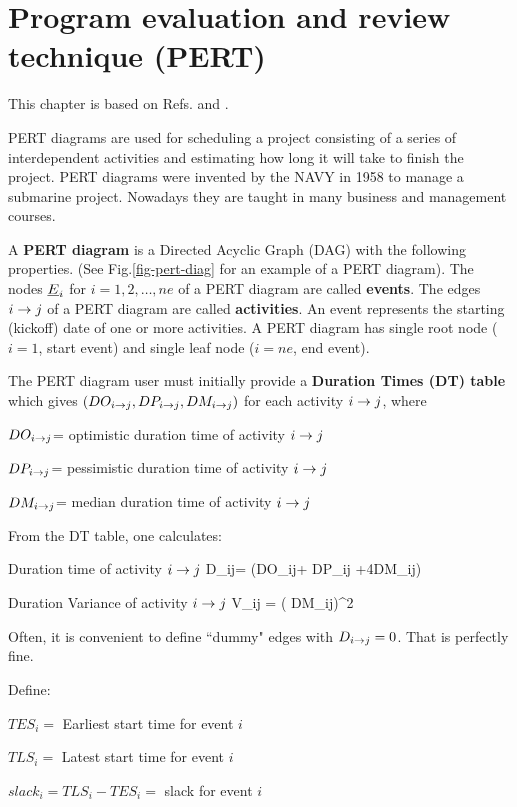 \chapter{Program evaluation
 and review technique (PERT)}
This chapter is based on
Refs.\cite{ibook} and \cite{wiki-pert}.

PERT diagrams are 
used for scheduling a 
project consisting of a series
of interdependent activities
and estimating how
long it will take
to finish the project.
PERT diagrams were invented by the NAVY 
in 1958
to manage a submarine project.
Nowadays they are taught in many business 
and management courses.

A {\bf PERT diagram}
is a  Directed Acyclic Graph (DAG)
with the following properties. 
(See Fig.\ref{fig-pert-diag}
for an example of a PERT diagram).
The nodes ${\underline{E}}_i$ for $i=1, 2, \ldots, ne$ of a
PERT diagram are called {\bf events}.
 The edges $i\rightarrow j$ of a PERT diagram are called
 {\bf activities}.
An event represents the starting 
(kickoff) date of one or more
activities.
A PERT diagram has single root node ($i=1$, start event)
and single leaf node ($i=ne$, end event).

The PERT diagram user 
must initially 
provide a
{\bf Duration Times (DT) table} which gives $(DO_{i\rightarrow j}, 
DP_{i\rightarrow j}, DM_{i\rightarrow j})$ for each activity
$i\rightarrow j$, where

$DO_{i\rightarrow j}$= optimistic duration time 
of activity $i\rightarrow j$

$DP_{i\rightarrow j}$= pessimistic duration time 
of activity $i\rightarrow j$

$DM_{i\rightarrow j}$= median duration time 
of activity $i\rightarrow j$

From the DT table, one calculates:

Duration time of activity $i\rightarrow j$ 
\beq
D_{i\rarrow j}= (DO_{i\rarrow j}+
DP_{i\rarrow j} +4DM_{i\rarrow j})
\eeq

Duration Variance of activity $i\rightarrow j$
\beq
V_{i\rarrow j} = \left(
{DM_{i\rarrow j}}\right)^2
\eeq

Often,
it is convenient to define
``dummy" edges with $D_{i\rightarrow j}=0$.
That is perfectly fine.

Define:

$TES_i=$ Earliest start time for event $i$

$TLS_i=$ Latest start time for event $i$

$slack_i=TLS_i-TES_i=$ slack for event $i$

